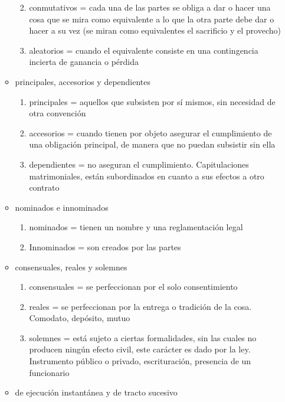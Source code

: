 \documentclass[]{article}
\providecommand{\tightlist}{%
  \setlength{\itemsep}{0pt}\setlength{\parskip}{0pt}}
\begin{document}
\begin{itemize}
\begin{itemize}
    \begin{enumerate}
    \def\labelenumi{\arabic{enumi}.}
    \tightlist
    \item
      conmutativos = cada una de las partes se obliga a dar o hacer una
      cosa que se mira como equivalente a lo que la otra parte debe dar
      o hacer a su vez (se miran como equivalentes el sacrificio y el
      provecho)
    \item
      aleatorios = cuando el equivalente consiste en una contingencia
      incierta de ganancia o pérdida
    \end{enumerate}
  \item
    principales, accesorios y dependientes

    \begin{enumerate}
    \def\labelenumi{\arabic{enumi}.}
    \tightlist
    \item
      principales = aquellos que subsisten por sí mismos, sin necesidad
      de otra convención
    \item
      accesorios = cuando tienen por objeto asegurar el cumplimiento de
      una obligación principal, de manera que no puedan subsistir sin
      ella
    \item
      dependientes = no aseguran el cumplimiento. Capitulaciones
      matrimoniales, están subordinados en cuanto a sus efectos a otro
      contrato
    \end{enumerate}
  \item
    nominados e innominados

    \begin{enumerate}
    \def\labelenumi{\arabic{enumi}.}
    \tightlist
    \item
      nominados = tienen un nombre y una reglamentación legal
    \item
      Innominados = son creados por las partes
    \end{enumerate}
  \item
    consensuales, reales y solemnes

    \begin{enumerate}
    \def\labelenumi{\arabic{enumi}.}
    \tightlist
    \item
      consensuales = se perfeccionan por el solo consentimiento
    \item
      reales = se perfeccionan por la entrega o tradición de la cosa.
      Comodato, depósito, mutuo
    \item
      solemnes = está sujeto a ciertas formalidades, sin las cuales no
      producen ningún efecto civil, este carácter es dado por la ley.
      Instrumento público o privado, escrituración, presencia de un
      funcionario
    \end{enumerate}
  \item
    de ejecución instantánea y de tracto sucesivo


\end{itemize}
\end{itemize}
\end{document}
